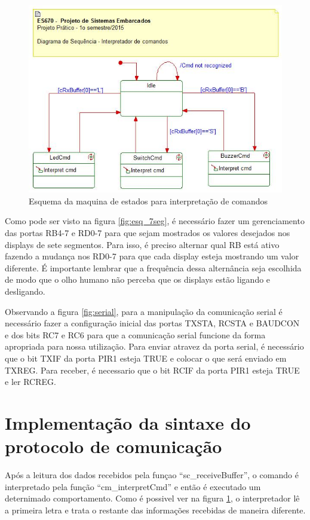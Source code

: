 \documentclass{article}
\begin{document}
\begin{figure}[H]
	\centering
	\includegraphics[width=0.9\linewidth]{maquina}
	\caption{Esquema da maquina de estados para interpretação de comandos}
	\label{fig:maquina}
\end{figure}

Como pode ser visto na figura \ref{fig:esq_7seg}, é necessário fazer um gerenciamento das portas RB4-7 e RD0-7 para que sejam mostrados os valores desejados nos displays de sete segmentos. Para isso, é preciso alternar qual RB está ativo fazendo a mudança nos RD0-7 para que cada display esteja mostrando um valor diferente. É importante lembrar que a frequência dessa alternância seja escolhida de modo que o olho humano não perceba que os displays estão ligando e desligando.

Observando a figura \ref{fig:serial}, para a manipulação da comunicação serial é necessário fazer a configuração inicial das portas TXSTA, RCSTA e BAUDCON e dos bits RC7 e RC6 para que a comunicação serial funcione da forma apropriada para nossa utilização.  Para enviar atravez da porta serial, é necessário que o bit TXIF da porta PIR1 esteja TRUE e colocar o que será enviado em TXREG. Para receber, é necessario que o bit RCIF da porta PIR1 esteja TRUE e ler RCREG.

\section{Implementação da sintaxe do protocolo de comunicação}

Após a leitura dos dados recebidos pela funçao ``sc\_receiveBuffer'', o comando é interpretado pela função ``cm\_interpretCmd'' e então é executado um deternimado comportamento. Como é possivel ver na figura \ref{fig:maquina}, o interpretador lê a primeira letra e trata o restante das informações recebidas de maneira diferente.
\end{document}
